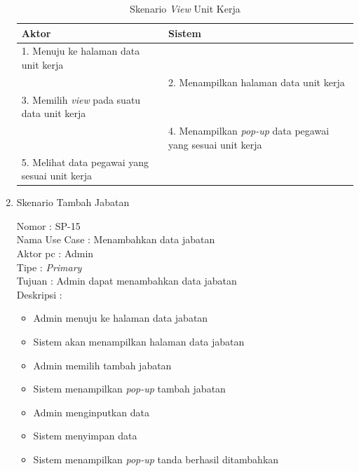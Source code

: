 \begin{enumerate}
\begin{table}
	\caption{Skenario \textit{View} Unit Kerja}
	\centering
	\begin{tabular}{ | p{63mm} | p{65mm} |}
		\hline 
		\textbf{Aktor} & \textbf{Sistem} \\
		\hline
		
		1.	Menuju ke halaman data unit kerja &  \\
		
		\hline
		
		&  2. Menampilkan halaman data unit kerja \\
		
		\hline
		
		3. Memilih \textit{view} pada suatu data unit kerja & \\
		
		\hline
		
		& 4. Menampilkan \textit{pop-up} data pegawai yang sesuai unit kerja \\
		\hline
		
		5. Melihat data pegawai yang sesuai unit kerja & \\
		
		\hline
		
		
	\end{tabular}
\end{table}

\item Skenario Tambah Jabatan

Nomor \kern 3.6pc : SP-15 \\
Nama Use Case : Menambahkan data jabatan \\
Aktor  pc : Admin \\
Tipe \kern 4.6pc : \textit{Primary} \\
Tujuan \kern 3.6pc : Admin dapat menambahkan data jabatan \\
Deskripsi \kern 2.5pc : 

\begin{itemize}
	\item Admin menuju ke halaman data jabatan
	\item Sistem akan menampilkan halaman data jabatan
	\item Admin memilih tambah jabatan
	\item Sistem menampilkan \textit{pop-up} tambah jabatan
	\item Admin menginputkan data
	\item Sistem menyimpan data
	\item Sistem menampilkan \textit{pop-up} tanda berhasil ditambahkan
	

\end{itemize}
\end{enumerate}

